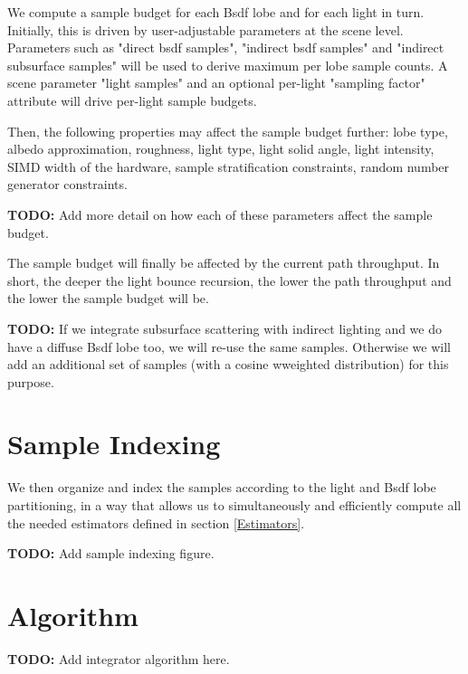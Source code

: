 \documentclass{article}
\begin{document}
We compute a sample budget for each Bsdf lobe and for each light in
turn. Initially, this is driven by user-adjustable parameters at the
scene level. Parameters such as "direct bsdf samples", "indirect
bsdf samples" and "indirect subsurface samples" will be used to
derive maximum per lobe sample counts. A scene parameter "light
samples" and an optional per-light "sampling factor" attribute will
drive per-light sample budgets.

Then, the following properties may affect the sample budget further:
lobe type, albedo approximation, roughness, light type, light solid
angle, light intensity, SIMD width of the hardware, sample
stratification constraints, random number generator constraints.

\textbf{TODO:} Add more detail on how each of these parameters
affect the sample budget.

The sample budget will finally be affected by the current path
throughput. In short, the deeper the light bounce recursion, the
lower the path throughput and the lower the sample budget will be.

\textbf{TODO:} If we integrate subsurface scattering with indirect
lighting and we do have a diffuse Bsdf lobe too, we will re-use the
same samples. Otherwise we will add an additional set of samples
(with a cosine wweighted distribution) for this purpose.



\section{Sample Indexing}\label{Indexing}

We then organize and index the samples according to the light and
Bsdf lobe partitioning, in a way that allows us to simultaneously
and efficiently compute all the needed estimators defined in section
\ref{Estimators}.

\textbf{TODO:} Add sample indexing figure.



\section{Algorithm}\label{Algorithm}

\textbf{TODO:} Add integrator algorithm here.







\end{document}

